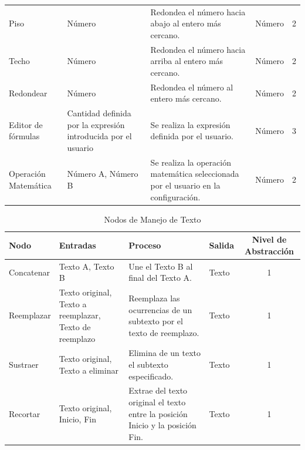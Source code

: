 \begin{table}[H]
\begin{tabularx}{\textwidth}{ l X X X c }
        Piso                 & Número                                                        & Redondea el número hacia abajo al entero más cercano.                               & Número          & 2                             \\
        Techo                & Número                                                        & Redondea el número hacia arriba al entero más cercano.                              & Número          & 2                             \\
        Redondear            & Número                                                        & Redondea el número al entero más cercano.                                           & Número          & 2                             \\
        Editor de fórmulas   & Cantidad definida por la expresión introducida por el usuario & Se realiza la expresión definida por el usuario.                                    & Número          & 3                             \\
        Operación Matemática & Número A, Número B                                            & Se realiza la operación matemática seleccionada por el usuario en la configuración. & Número          & 2                             \\
        \hline
    \end{tabularx}
\end{table}

\begin{table}[H]
    \centering
    \caption{Nodos de Manejo de Texto}
    \begin{tabularx}{\textwidth}{ l X X X c }
        \hline
        \textbf{Nodo} & \textbf{Entradas}                                      & \textbf{Proceso}                                                               & \textbf{Salida} & \textbf{Nivel de Abstracción} \\ \hline
        Concatenar    & Texto A, Texto B                                       & Une el Texto B al final del Texto A.                                           & Texto           & 1                             \\
        Reemplazar    & Texto original, Texto a reemplazar, Texto de reemplazo & Reemplaza las ocurrencias de un subtexto por el texto de reemplazo.            & Texto           & 1                             \\
        Sustraer      & Texto original, Texto a eliminar                       & Elimina de un texto el subtexto especificado.                                  & Texto           & 1                             \\
        Recortar      & Texto original, Inicio, Fin                            & Extrae del texto original el texto entre la posición Inicio y la posición Fin. & Texto           & 1                             \\
        \hline
    \end{tabularx}
\end{table}

